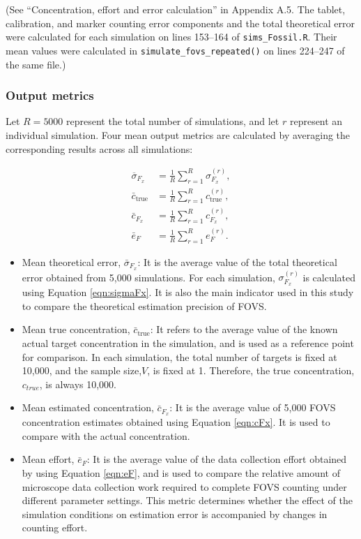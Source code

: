 \documentclass[
  12pt,
]{article}
\begin{document}
(See ``Concentration, effort and error calculation'' in Appendix A.5.
The tablet, calibration, and marker counting error components and the
total theoretical error were calculated for each simulation on lines
153--164 of \texttt{sims\_Fossil.R}. Their mean values were calculated
in \texttt{simulate\_fovs\_repeated()} on lines 224--247 of the same
file.)

\subsubsection{Output metrics}\label{output-metrics}

Let \(R=5000\) represent the total number of simulations, and let \(r\)
represent an individual simulation. Four mean output metrics are
calculated by averaging the corresponding results across all
simulations:

\begin{align}
\label{eqn:output-metrics}
\overline{\sigma}_{F_x}
&=
\frac{1}{R}\sum_{r=1}^{R}\sigma_{F_x}^{(r)}, \\
\bar{c}_{\mathrm{true}}
&=
\frac{1}{R}\sum_{r=1}^{R}c_{\mathrm{true}}^{(r)}, \\
\bar{c}_{F_x}
&=
\frac{1}{R}\sum_{r=1}^{R}c_{F_x}^{(r)}, \\
\bar{e}_{F}
&=
\frac{1}{R}\sum_{r=1}^{R}e_F^{(r)}.
\end{align}

\begin{itemize}
\item
  Mean theoretical error, \(\bar{\sigma}_{F_x}\): It is the average
  value of the total theoretical error obtained from 5,000 simulations.
  For each simulation, \(\sigma_{F_x}^{(r)}\) is calculated using
  Equation \eqref{eqn:sigmaFx}. It is also the main indicator used in
  this study to compare the theoretical estimation precision of FOVS.
\item
  Mean true concentration, \(\bar c_{\mathrm{true}}\): It refers to the
  average value of the known actual target concentration in the
  simulation, and is used as a reference point for comparison. In each
  simulation, the total number of targets is fixed at 10,000, and the
  sample size,\(V\), is fixed at 1. Therefore, the true concentration,
  \(c_{true}\), is always 10,000.
\item
  Mean estimated concentration, \(\bar c_{F_x}\): It is the average
  value of 5,000 FOVS concentration estimates obtained using Equation
  \eqref{eqn:cFx}. It is used to compare with the actual concentration.
\item
  Mean effort, \(\bar e_F\): It is the average value of the data
  collection effort obtained by using Equation \eqref{eqn:eF}, and is
  used to compare the relative amount of microscope data collection work
  required to complete FOVS counting under different parameter settings.
  This metric determines whether the effect of the simulation conditions
  on estimation error is accompanied by changes in counting effort.
\end{itemize}
\end{document}

